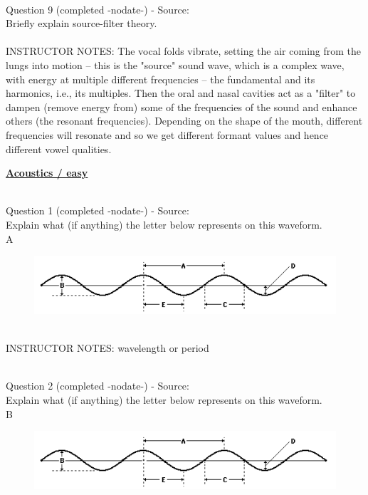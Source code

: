 \documentclass[12pt]{article}
\begin{document}
~\\

{\large Question 9} (completed -nodate-) - Source: \\

Briefly explain source-filter theory.\\


~\\
INSTRUCTOR NOTES: The vocal folds vibrate, setting the air coming from the lungs into motion -- this is the "source" sound wave, which is a complex wave, with energy at multiple different frequencies – the fundamental and its harmonics, i.e., its multiples. Then the oral and nasal cavities act as a "filter" to dampen (remove energy from) some of the frequencies of the sound and enhance others (the resonant frequencies). Depending on the shape of the mouth, different frequencies will resonate and so we get different formant values and hence different vowel qualities.


\newpage\textbf{\underline{\huge Acoustics / easy\\}}

~\\

{\large Question 1} (completed -nodate-) - Source: \\

Explain what (if anything) the letter below represents on this waveform.\\

A

\begin{figure}[H]
\includegraphics{../images/sinusoid.png}
\end{figure}

~\\
INSTRUCTOR NOTES: wavelength or period


~\\

{\large Question 2} (completed -nodate-) - Source: \\

Explain what (if anything) the letter below represents on this waveform.\\

B

\begin{figure}[H]
\includegraphics{../images/sinusoid.png}
\end{figure}
\end{document}
